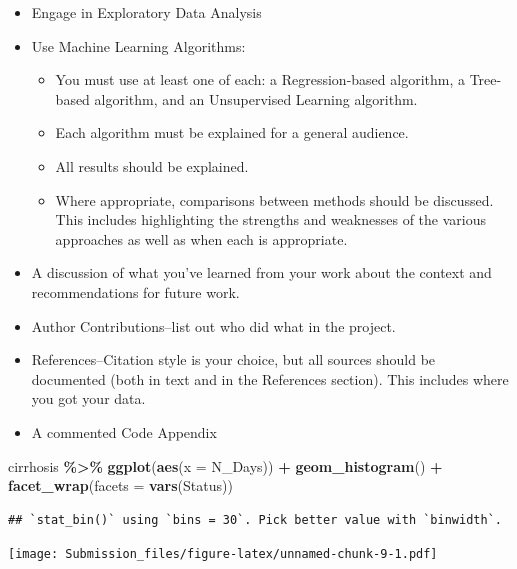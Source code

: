 \documentclass[
]{article}
\newenvironment{Shaded}{\begin{snugshade}}{\end{snugshade}}
\newcommand{\AttributeTok}[1]{\textcolor[rgb]{0.13,0.29,0.53}{#1}}
\newcommand{\FunctionTok}[1]{\textcolor[rgb]{0.13,0.29,0.53}{\textbf{#1}}}
\newcommand{\NormalTok}[1]{#1}
\newcommand{\SpecialCharTok}[1]{\textcolor[rgb]{0.81,0.36,0.00}{\textbf{#1}}}
\providecommand{\tightlist}{%
  \setlength{\itemsep}{0pt}\setlength{\parskip}{0pt}}
\begin{document}
\begin{itemize}
\item
  Engage in Exploratory Data Analysis
\item
  Use Machine Learning Algorithms:

  \begin{itemize}
  \tightlist
  \item
    You must use at least one of each: a Regression-based algorithm, a
    Tree-based algorithm, and an Unsupervised Learning algorithm.
  \item
    Each algorithm must be explained for a general audience.
  \item
    All results should be explained.
  \item
    Where appropriate, comparisons between methods should be discussed.
    This includes highlighting the strengths and weaknesses of the
    various approaches as well as when each is appropriate.
  \end{itemize}
\item
  A discussion of what you've learned from your work about the context
  and recommendations for future work.
\item
  Author Contributions--list out who did what in the project.
\item
  References--Citation style is your choice, but all sources should be
  documented (both in text and in the References section). This includes
  where you got your data.
\item
  A commented Code Appendix
\end{itemize}

\begin{Shaded}
\begin{Highlighting}[]
\NormalTok{cirrhosis }\SpecialCharTok{\%\textgreater{}\%} 
  \FunctionTok{ggplot}\NormalTok{(}\FunctionTok{aes}\NormalTok{(}\AttributeTok{x =}\NormalTok{ N\_Days)) }\SpecialCharTok{+} \FunctionTok{geom\_histogram}\NormalTok{() }\SpecialCharTok{+}
  \FunctionTok{facet\_wrap}\NormalTok{(}\AttributeTok{facets =} \FunctionTok{vars}\NormalTok{(Status))}
\end{Highlighting}
\end{Shaded}

\begin{verbatim}
## `stat_bin()` using `bins = 30`. Pick better value with `binwidth`.
\end{verbatim}

\texttt{[image: Submission\_files/figure-latex/unnamed-chunk-9-1.pdf]}
\end{document}
